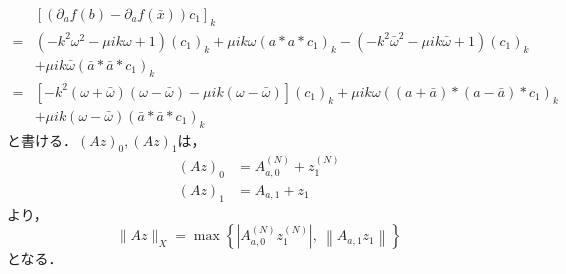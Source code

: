 \begin{equation*}
  \begin{split}
    &\left[ \left( \partial_a f(b) - \partial_a f(\bar{x}) \right){c_1} \right]_k \\
    =& \left( -k^2\omega^2 - \mu ik \omega + 1 \right) \left( c_1 \right)_k + \mu ik \omega (a * a * c_1)_k - \left( -k^2\bar{\omega}^2 - \mu ik \bar{\omega} + 1 \right) \left( c_1 \right)_k \\
    &+ \mu ik \bar{\omega} (\bar{a} * \bar{a} * c_1)_k \\
    =& \left[ -k^2\left(\omega + \bar{\omega}\right) \left(\omega - \bar{\omega}\right) - \mu ik \left(\omega - \bar{\omega}\right) \right] \left(c_1\right)_k + \mu ik \omega \left(\left(a+\bar{a}\right)*\left(a-\bar{a}\right)*c_1\right)_k \\
    &+ \mu ik \left(\omega - \bar{\omega}\right) \left( \bar{a} * \bar{a} * c_1 \right)_k
  \end{split}
\end{equation*}
と書ける．$(Az)_0,(Az)_1$は，
\begin{align*}
  (Az)_0 & = A_{a,0}^{(N)} + z_1^{(N)} \\
  (Az)_1 & = A_{a,1} + z_1
\end{align*}
より，
\begin{equation*}
  \|Az\|_X = \max\left\{ \left| A_{a,0}^{(N)} z_1^{(N)} \right|,\ \left\| A_{a,1} z_1 \right\| \right\}
\end{equation*}
となる．

